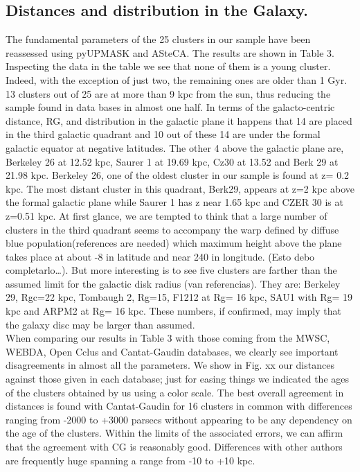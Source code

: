 \documentclass[draft]{aa}
\begin{document}
 \subsection{Distances and distribution in the Galaxy.}
The fundamental parameters of the 25 clusters in our sample have been reassessed
using pyUPMASK and ASteCA. The results are shown in Table 3. Inspecting the data
in the table we see that none of them is a young cluster. Indeed, with the
exception of just two, the remaining ones are older than 1 Gyr. 13 clusters out
of 25 are at more than 9 kpc from the sun, thus reducing the sample found in
data bases in almost one half. 
In terms of the galacto-centric distance, RG, and distribution in the galactic
plane it happens that 14 are placed in the third galactic quadrant and 10 out of
these 14 are under the formal galactic equator at negative latitudes. The other
4 above the galactic plane are, Berkeley 26 at 12.52 kpc, Saurer 1 at 19.69 kpc,
Cz30 at 13.52 and Berk 29 at 21.98 kpc.  Berkeley 26, one of the oldest cluster
in our sample is found at z= 0.2 kpc. The most distant cluster in this quadrant,
Berk29, appears at z=2 kpc above the formal galactic plane while Saurer 1 has z
near 1.65 kpc and CZER 30 is at z=0.51 kpc.  At first glance, we are tempted to
think that a large number of clusters in the third quadrant seems to accompany
the warp defined by diffuse blue population(references are needed) which maximum
height above the plane takes place at about -8 in latitude and near 240 in longitude.
(Esto debo completarlo…).
But more interesting is to see five clusters are farther than the assumed limit
for the galactic disk radius (van referencias). They are: Berkeley 29, Rgc=22 kpc,
Tombaugh 2, Rg=15, F1212 at Rg= 16 kpc,  SAU1 with Rg= 19 kpc and ARPM2 at
Rg= 16 kpc. These numbers, if confirmed, may imply that the galaxy disc may be
larger than assumed.\\

 When comparing our results in Table 3 with those coming from the MWSC, WEBDA,
Open Cclus and Cantat-Gaudin databases, we clearly see important disagreements
in almost all the parameters. We show in Fig. xx our distances against those
given in each database;  just for easing things we indicated the ages of the
clusters obtained  by us using a color scale. The best overall agreement in
distances is found with Cantat-Gaudin for 16 clusters in common with differences
ranging from -2000 to +3000 parsecs without appearing to be any dependency on
the age of the clusters.  Within the limits of the associated errors, we can
affirm that the agreement with CG is reasonably good.  Differences with other
authors are frequently huge spanning a range from -10 to +10 kpc. 
\end{document}
